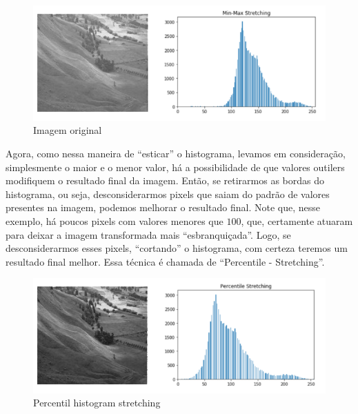 \documentclass[a4paper, 12pt]{article}
\begin{document}
\begin{figure}[!htbp]
	\centering
	\includegraphics[scale=0.5]{images/minMax.png}
	\caption{Imagem original}
\end{figure}
\vspace{2cm}
Agora, como nessa maneira de ``esticar'' o histograma, levamos em consideração, simplesmente o maior e o menor valor, há a possibilidade de que valores outilers 
modifiquem o resultado final da imagem. Então, se retirarmos as bordas do histograma, ou seja, desconsiderarmos pixels que saiam do padrão de valores 
presentes na imagem, podemos melhorar o resultado final. Note que, nesse exemplo, há poucos pixels com valores menores que $100$, que, certamente atuaram para 
deixar a imagem transformada mais ``esbranquiçada''. Logo, se desconsiderarmos esses pixels, ``cortando'' o histograma, com certeza teremos um resultado final melhor.
Essa técnica é chamada de ``Percentile - Stretching''.


\begin{figure}[!htbp]
	\centering
	\includegraphics[scale=0.4]{images/percentile.png}
	\caption{Percentil histogram stretching}
\end{figure}
\end{document}
